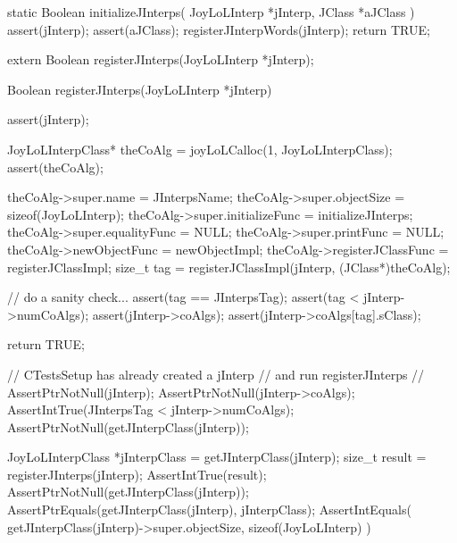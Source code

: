\startCCode
static Boolean initializeJInterps(
  JoyLoLInterp *jInterp,
  JClass   *aJClass
) {
  assert(jInterp);
  assert(aJClass);
  registerJInterpWords(jInterp);
  return TRUE;
}
\stopCCode

\startTestSuite[regiserJInterps]

\startCHeader
extern Boolean registerJInterps(JoyLoLInterp *jInterp);
\stopCHeader
{}

\startCCode
Boolean registerJInterps(JoyLoLInterp *jInterp) {
  assert(jInterp);
  
  JoyLoLInterpClass* theCoAlg =
    joyLoLCalloc(1, JoyLoLInterpClass);
  assert(theCoAlg);
  
  theCoAlg->super.name             = JInterpsName;
  theCoAlg->super.objectSize       = sizeof(JoyLoLInterp);
  theCoAlg->super.initializeFunc   = initializeJInterps;
  theCoAlg->super.equalityFunc     = NULL;
  theCoAlg->super.printFunc        = NULL;
  theCoAlg->newObjectFunc          = newObjectImpl;
  theCoAlg->registerJClassFunc = registerJClassImpl;
  size_t tag =
    registerJClassImpl(jInterp, (JClass*)theCoAlg);
  
  // do a sanity check...
  assert(tag == JInterpsTag);
  assert(tag < jInterp->numCoAlgs);
  assert(jInterp->coAlgs);
  assert(jInterp->coAlgs[tag].sClass);
    
  return TRUE;
}
\stopCCode


\startCTest
  // CTestsSetup has already created a jInterp 
  // and run registerJInterps
  //
  AssertPtrNotNull(jInterp);
  AssertPtrNotNull(jInterp->coAlgs);
  AssertIntTrue(JInterpsTag < jInterp->numCoAlgs);
  AssertPtrNotNull(getJInterpClass(jInterp));
  
  JoyLoLInterpClass *jInterpClass = getJInterpClass(jInterp);
  size_t result = registerJInterps(jInterp);
  AssertIntTrue(result);
  AssertPtrNotNull(getJInterpClass(jInterp));
  AssertPtrEquals(getJInterpClass(jInterp), jInterpClass);
  AssertIntEquals(
    getJInterpClass(jInterp)->super.objectSize,
    sizeof(JoyLoLInterp)
  )
\stopCTest
\stopTestCase
\stopTestSuite

